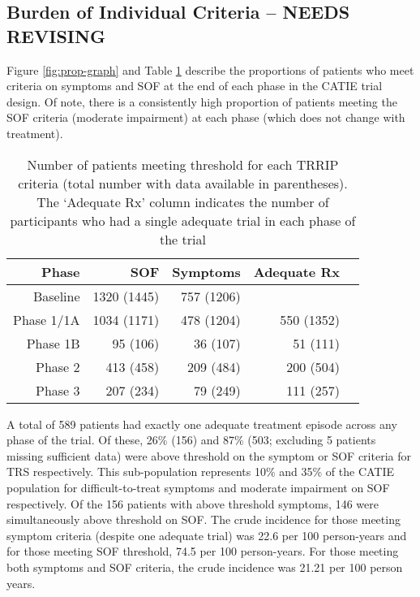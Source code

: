 \documentclass[a4paper,nobib]{article}
\begin{document}
\subsection*{Burden of Individual Criteria -- NEEDS REVISING}
Figure \ref{fig:prop-graph} and Table \ref{tab-proportions} describe the proportions of patients who meet criteria on symptoms and SOF at the end of each phase in the CATIE trial design.  Of note, there is a consistently high proportion of patients meeting the SOF criteria (moderate impairment) at each phase (which does not change with treatment). 


\begin{table}[ht]
\centering
\begin{tabular}{rrrrr}
  \hline
  Phase      & SOF   & Symptoms & Adequate Rx  \\ 
  \hline
  Baseline   &  1320 (1445) & 757 (1206)  \\ 
  Phase 1/1A &  1034 (1171) & 478 (1204) & 550 (1352) \\ 
  Phase 1B   &  95 (106)    & 36 (107) & 51 (111) \\ 
  Phase 2    &  413 (458)   & 209 (484) & 200 (504)  \\ 
  Phase 3    &  207 (234)   & 79 (249) & 111 (257)  \\ 
   \hline
\end{tabular}
\caption{Number of patients meeting threshold for each TRRIP criteria (total number with data available in parentheses).  The `Adequate Rx' column indicates the number of participants who had a single adequate trial in each phase of the trial}
\label{tab-proportions}
\end{table}

A total of 589 patients had exactly one adequate treatment episode across any phase of the trial.  Of these, 26\% (156) and 87\% (503; excluding 5 patients missing sufficient data) were above threshold on the symptom or SOF criteria for TRS respectively.  This sub-population represents 10\% and 35\% of the CATIE population for difficult-to-treat symptoms and moderate impairment on SOF respectively. Of the 156 patients with above threshold symptoms, 146 were simultaneously above threshold on SOF. The crude incidence for those meeting symptom criteria (despite one adequate trial) was 22.6 per 100 person-years and for those meeting SOF threshold, 74.5 per 100 person-years.   For those meeting both symptoms and SOF criteria, the crude incidence was 21.21 per 100 person years.
\end{document}
